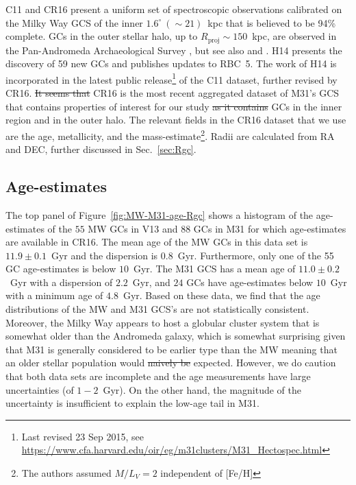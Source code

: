 \documentclass[a4paper,fleqn,usenatbib]{mnras}
\providecommand{\DIFadd}[1]{{\protect\color{blue}\uwave{#1}}} %
\providecommand{\DIFdel}[1]{{\protect\color{red}\sout{#1}}}                      %
\providecommand{\DIFaddbegin}{} %
\providecommand{\DIFaddend}{} %
\providecommand{\DIFdelbegin}{} %
\providecommand{\DIFdelend}{} %
\newcommand{\DIFscaledelfig}{0.5}
\newlength{\DIFdelgraphicswidth} %
\newlength{\DIFdelgraphicsheight} %
\newcommand{\DIFaddincludegraphics}[2][]{{\color{blue}\fbox{\DIFOincludegraphics[#1]{#2}}}} %
\newcommand{\DIFdelincludegraphics}[2][]{%
\sbox{\DIFdelgraphicsbox}{\DIFOincludegraphics[#1]{#2}}%
\settoboxwidth{\DIFdelgraphicswidth}{\DIFdelgraphicsbox} %
\settoboxtotalheight{\DIFdelgraphicsheight}{\DIFdelgraphicsbox} %
\scalebox{\DIFscaledelfig}{%
\parbox[b]{\DIFdelgraphicswidth}{\usebox{\DIFdelgraphicsbox}\\[-\baselineskip] \rule{\DIFdelgraphicswidth}{0em}}\llap{\resizebox{\DIFdelgraphicswidth}{\DIFdelgraphicsheight}{%
\setlength{\unitlength}{\DIFdelgraphicswidth}%
\begin{picture}(1,1)%
\thicklines\linethickness{2pt} %
{\color[rgb]{1,0,0}\put(0,0){\framebox(1,1){}}}%
{\color[rgb]{1,0,0}\put(0,0){\line( 1,1){1}}}%
{\color[rgb]{1,0,0}\put(0,1){\line(1,-1){1}}}%
\end{picture}%
}\hspace*{3pt}}} %
} %
\DeclareRobustCommand{\DIFaddbegin}{\DIFOaddbegin \let\includegraphics\DIFaddincludegraphics} %
\DeclareRobustCommand{\DIFaddend}{\DIFOaddend \let\includegraphics\DIFOincludegraphics} %
\DeclareRobustCommand{\DIFdelbegin}{\DIFOdelbegin \let\includegraphics\DIFdelincludegraphics} %
\DeclareRobustCommand{\DIFdelend}{\DIFOaddend \let\includegraphics\DIFOincludegraphics} %
\begin{document}
C11 and CR16 present a uniform set of spectroscopic observations calibrated
on the Milky Way GCS of the inner $1.6^\circ~({\sim}21)$~kpc that
is believed to be 94\% complete. GCs in the outer stellar halo, up to
$R_{\text{proj}}\sim150$~kpc, are observed in the Pan-Andromeda Archaeological
Survey \citep[PAndAS, ][hereafter H14]{2014MNRAS.442.2165H}, but see also
\citet{2014MNRAS.442.2929V} and \citet{2019MNRAS.484.1756M}. H14 presents the
discovery of 59 new GCs and publishes updates to RBC~5. The work of H14 is
incorporated in the latest public release\footnote{Last revised 23 Sep 2015, see
\url{https://www.cfa.harvard.edu/oir/eg/m31clusters/M31_Hectospec.html}}
of the C11 dataset, further revised by CR16. \DIFdelbegin \DIFdel{It seems that }\DIFdelend \DIFaddbegin \DIFadd{We use }\DIFaddend CR16 \DIFaddbegin \DIFadd{because it }\DIFaddend is the most
recent aggregated dataset of M31's GCS that contains properties of interest
for our study \DIFdelbegin \DIFdel{as it contains }\DIFdelend \DIFaddbegin \DIFadd{and it includes }\DIFaddend GCs in the inner region and in the outer halo. The
relevant fields in the CR16 dataset that we use are the age, metallicity, and the
mass-estimate\footnote{The authors assumed $M/L_V = 2$ independent of [Fe/H]}.
Radii are calculated from RA and DEC, further discussed in Sec.~\ref{sec:Rgc}.

\subsection{Age-estimates}
The top panel of Figure~\ref{fig:MW-M31-age-Rgc} shows a histogram of the age-estimates
of the $55$ MW GCs in V13 and $88$ GCs in M31 for which age-estimates are available
in CR16. The mean age of the MW GCs in this data set is $11.9 \pm 0.1$~Gyr and the 
dispersion is $0.8$~Gyr. Furthermore, only one of the 55 GC age-estimates is
below $10$~Gyr. The M31 GCS has a mean age of $11.0 \pm 0.2$~Gyr with a dispersion 
of $2.2$~Gyr, and $24$ GCs have age-estimates below $10$~Gyr with a minimum age 
of $4.8$~Gyr. Based on these data, we find that the age distributions of the MW 
and M31 GCS's are not statistically consistent. Moreover, the Milky Way appears 
to host a globular cluster system that is somewhat older than the Andromeda galaxy,
which is somewhat surprising given that M31 is generally considered to be earlier
type than the MW meaning that an older stellar population would \DIFdelbegin \DIFdel{naively be }\DIFdelend \DIFaddbegin \DIFadd{be naively }\DIFaddend expected.
However, we do caution that both data sets are incomplete and the age 
measurements have large uncertainties (of $1-2$~Gyr). On the other hand, the 
magnitude of the uncertainty is insufficient to explain the low-age tail in M31.
\end{document}
